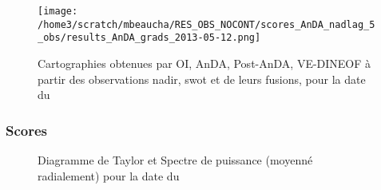 \documentclass[fleqn]{report}
\begin{document}
\begin{figure}[H]
  \hspace{-2cm}\texttt{[image: /home3/scratch/mbeaucha/RES\_OBS\_NOCONT/scores\_AnDA\_nadlag\_5\_obs/results\_AnDA\_grads\_2013-05-12.png]}
  \caption{Cartographies obtenues par OI, AnDA, Post-AnDA, VE-DINEOF à partir des observations nadir, swot et de leurs fusions, pour la date du }
\end{figure}


\subsubsection{Scores}

\begin{figure}[H]
  \centering
  \hfill
  \caption{Diagramme de Taylor et Spectre de puissance (moyenné radialement) pour la date du }
\end{figure} 
\end{document}
